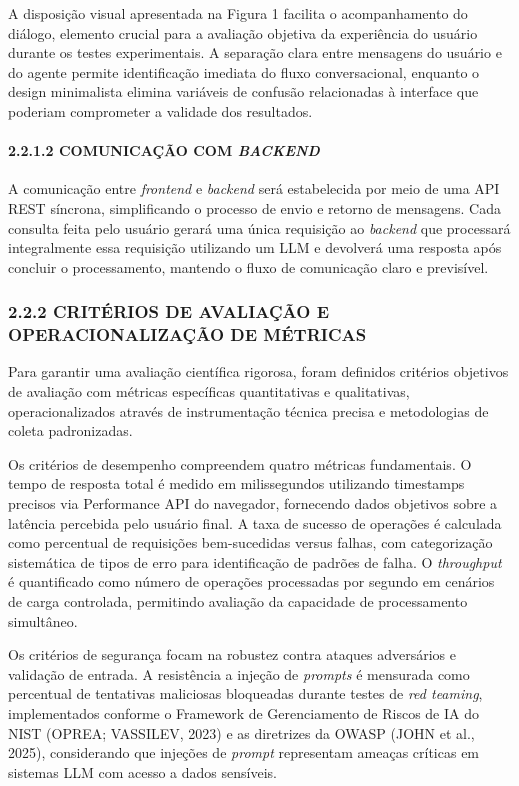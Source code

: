 \documentclass[
]{article}
\begin{document}
A disposição visual apresentada na Figura 1 facilita o acompanhamento do
diálogo, elemento crucial para a avaliação objetiva da experiência do
usuário durante os testes experimentais. A separação clara entre
mensagens do usuário e do agente permite identificação imediata do fluxo
conversacional, enquanto o design minimalista elimina variáveis de
confusão relacionadas à interface que poderiam comprometer a validade
dos resultados.

\paragraph{\texorpdfstring{2.2.1.2 COMUNICAÇÃO COM
\emph{BACKEND}}{2.2.1.2 COMUNICAÇÃO COM BACKEND}}\label{comunicauxe7uxe3o-com-backend}

A comunicação entre \emph{frontend} e \emph{backend} será estabelecida
por meio de uma API REST síncrona, simplificando o processo de envio e
retorno de mensagens. Cada consulta feita pelo usuário gerará uma única
requisição ao \emph{backend} que processará integralmente essa
requisição utilizando um LLM e devolverá uma resposta após concluir o
processamento, mantendo o fluxo de comunicação claro e previsível.

\subsubsection{2.2.2 CRITÉRIOS DE AVALIAÇÃO E OPERACIONALIZAÇÃO DE
MÉTRICAS}\label{crituxe9rios-de-avaliauxe7uxe3o-e-operacionalizauxe7uxe3o-de-muxe9tricas}

Para garantir uma avaliação científica rigorosa, foram definidos
critérios objetivos de avaliação com métricas específicas quantitativas
e qualitativas, operacionalizados através de instrumentação técnica
precisa e metodologias de coleta padronizadas.

Os critérios de desempenho compreendem quatro métricas fundamentais. O
tempo de resposta total é medido em milissegundos utilizando timestamps
precisos via Performance API do navegador, fornecendo dados objetivos
sobre a latência percebida pelo usuário final. A taxa de sucesso de
operações é calculada como percentual de requisições bem-sucedidas
versus falhas, com categorização sistemática de tipos de erro para
identificação de padrões de falha. O \emph{throughput} é quantificado
como número de operações processadas por segundo em cenários de carga
controlada, permitindo avaliação da capacidade de processamento
simultâneo.

Os critérios de segurança focam na robustez contra ataques adversários e
validação de entrada. A resistência a injeção de \emph{prompts} é
mensurada como percentual de tentativas maliciosas bloqueadas durante
testes de \emph{red teaming}, implementados conforme o Framework de
Gerenciamento de Riscos de IA do NIST (OPREA; VASSILEV, 2023) e as
diretrizes da OWASP (JOHN et al., 2025), considerando que injeções de
\emph{prompt} representam ameaças críticas em sistemas LLM com acesso a
dados sensíveis.
\end{document}
